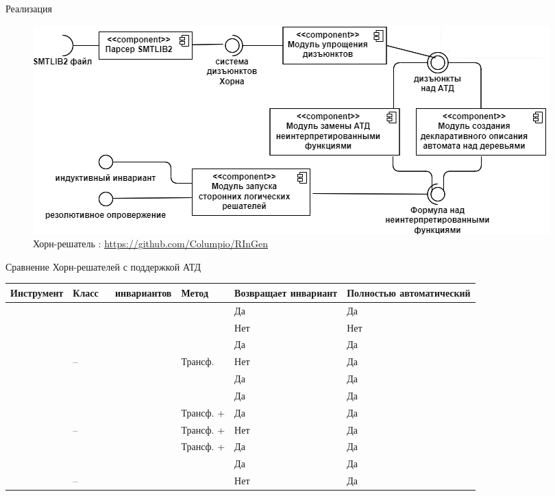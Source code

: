 \begin{frame}{Реализация}
\begin{figure}[h]
\centering
\includegraphics[width=\textwidth]{resources/arch.png}
\caption{Хорн-решатель \theringen{}: \url{https://github.com/Columpio/RInGen}}
\end{figure}
\end{frame}

\begin{frame}{Сравнение Хорн-решателей с поддержкой АТД}
\begin{table}
\centering\footnotesize
\begin{tabular}{| m{38mm} || x{18mm} | x{18mm} | x{18mm} | x{23mm} |}
\hline
Инструмент & Класс\quad\ \ \  инвариантов & Метод & Возвращает инвариант & Полностью автоматический\\\hline\hline
\spacer{} & \elemclass{} & \pdr{} & Да & Да\\
\racer{} & \catelemclass{} & \pdr{} & Нет & Нет\\
\eldarica{} & \sizeelemclass{} & \cegar{} & Да & Да\\
\vericat{} & -- & Трансф. & Нет & Да\\
\hoice{} & \elemclass{} & \ice{} & Да & Да\\
\rchc{}  & \syncRegFlatClass{} & \ice{} & Да & Да\\\hline
\ringen{\cvc} & \regclass{} & Трансф. + \fmf{} & Да & Да\\
\ringen{\vampire} & -- & Трансф. + \satur{} & Нет & Да\\
\ringenSync{} & \syncRegFullClass{} & Трансф. + \fmf{} & Да & Да\\
\ringenCICI{\cvc} & \regelemclass{} & \ourCEGAR{} & Да & Да\\
\ringenCICI{\vampire} & -- & \ourCEGAR{} & Нет & Да\\
\hline
\end{tabular}
\end{table}
\end{frame}

